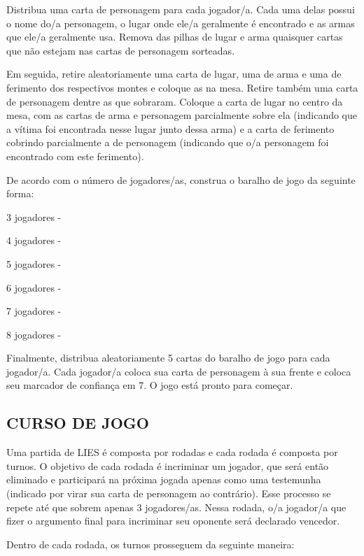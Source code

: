 \documentclass[a4paper, 11pt]{article}
\begin{document}
	Distribua uma carta de personagem para cada jogador/a. Cada uma delas possui o nome do/a personagem, o lugar onde ele/a geralmente é encontrado e as armas que ele/a geralmente usa. Remova das pilhas de lugar e arma quaisquer cartas que não estejam nas cartas de personagem sorteadas.


	Em seguida, retire aleatoriamente uma carta de lugar, uma de arma e uma de ferimento dos respectivos montes e coloque as na mesa. Retire também uma carta de personagem dentre as que sobraram. Coloque a carta de lugar no centro da mesa, com as cartas de arma e personagem parcialmente sobre ela (indicando que a vítima foi encontrada nesse lugar junto dessa arma) e a carta de ferimento cobrindo parcialmente a de personagem (indicando que o/a personagem foi encontrado com este ferimento).

	De acordo com o número de jogadores/as, construa o baralho de jogo da seguinte forma:


	3 jogadores - 

	4 jogadores - 

	5 jogadores - 

	6 jogadores - 

	7 jogadores  - 

	8 jogadores - 

	Finalmente, distribua aleatoriamente 5 cartas do baralho de jogo para cada jogador/a. Cada jogador/a coloca sua carta de personagem à sua frente e coloca seu marcador de confiança em 7. O jogo está pronto para começar.

\subsection*{CURSO DE JOGO}

	Uma partida de LIES é composta por rodadas e cada rodada é composta por turnos. O objetivo de cada rodada é incriminar um jogador, que será então eliminado e participará na próxima jogada apenas como uma testemunha (indicado por virar sua carta de personagem ao contrário). Esse processo se repete até que sobrem apenas 3 jogadores/as. Nessa rodada, o/a jogador/a que fizer o argumento final para incriminar seu oponente será declarado vencedor.

	Dentro de cada rodada, os turnos prosseguem da seguinte maneira:
\end{document}
